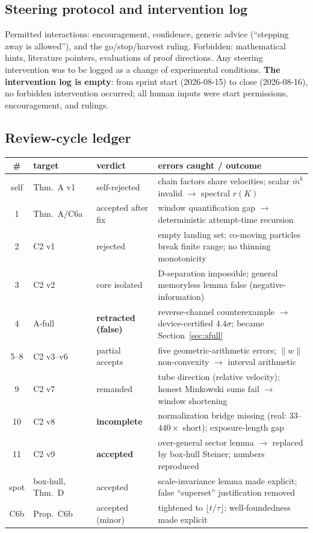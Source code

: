 \documentclass[11pt]{article}
\begin{document}
\subsection{Steering protocol and intervention log}
Permitted interactions: encouragement, confidence, generic advice
(``stepping away is allowed''), and the go/stop/harvest ruling. Forbidden:
mathematical hints, literature pointers, evaluations of proof directions.
Any steering intervention was to be logged as a change of experimental
conditions. \textbf{The intervention log is empty}: from sprint start
(2026-08-15) to close (2026-08-16), no forbidden intervention occurred; all
human inputs were start permissions, encouragement, and rulings.

\subsection{Review-cycle ledger}
\begin{center}
\footnotesize
\begin{tabular}{clp{3.1cm}p{6.9cm}}
\toprule
\# & target & verdict & errors caught / outcome\\
\midrule
self & Thm.~A v1 & self-rejected & chain factors share velocities; scalar $\bar m^k$ invalid $\to$ spectral $r(K)$\\[1pt]
1 & Thm.~A/C6a & accepted after fix & window quantification gap $\to$ deterministic attempt-time recursion\\
2 & C2 v1 & rejected & empty landing set; co-moving particles break finite range; no thinning monotonicity\\
3 & C2 v2 & core isolated & D-separation impossible; general memoryless lemma false (negative-information)\\
4 & A-full & \textbf{retracted (false)} & reverse-channel counterexample $\to$ device-certified $4.4\sigma$; became Section~\ref{sec:afull}\\
5--8 & C2 v3--v6 & partial accepts & five geometric-arithmetic errors; $\|w\|$ non-convexity $\to$ interval arithmetic\\
9 & C2 v7 & remanded & tube direction (relative velocity); honest Minkowski sums fail $\to$ window shortening\\
10 & C2 v8 & \textbf{incomplete} & normalization bridge missing (real: $33$--$440\times$ short); exposure-length gap\\
11 & C2 v9 & \textbf{accepted} & over-general sector lemma $\to$ replaced by box-hull Steiner; numbers reproduced\\
spot & box-hull, Thm.~D & accepted & scale-invariance lemma made explicit; false ``superset'' justification removed\\
C6b & Prop.~C6b & accepted (minor) & tightened to $\lfloor t/\tau\rfloor$; well-foundedness made explicit\\
\bottomrule
\end{tabular}
\end{center}
\end{document}
